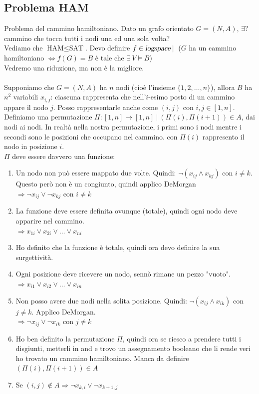 \documentclass[10pt]{book}
\begin{document}
\subsection{Problema HAM}
Problema del cammino hamiltoniano. Dato un grafo orientato $G = (N, A)$, $\exists?$ cammino che tocca tutti i nodi una ed una sola volta?\\
Vediamo che $\text{HAM} \leq \text{SAT}$. Devo definire $f \in \textsl{logspace}\:|\:$ ($G$ ha un cammino hamiltoniano $\Leftrightarrow f(G) = B$ è tale che $\exists\:V\vDash B$)\\
Vedremo una riduzione, ma non è la migliore.\\\\
Supponiamo che $G = (N, A)$ ha $n$ nodi (cioè l'insieme $\{1, 2, \ldots, n\}$), allora $B$ ha $n^2$ variabili $x_{i,j}$: ciascuna rappresenta che nell'$i$-esimo posto di un cammino appare il nodo $j$. Posso rappresentarle anche come $(i, j)$ con $i, j \in [1, n]$.\\
Definiamo una permutazione $\Pi : [1, n] \rightarrow [1, n]\:|\:\left(\Pi(i), \Pi(i+1)\right) \in A$, dai nodi ai nodi. In realtà nella nostra permutazione, i primi sono i nodi mentre i secondi sono le posizioni che occupano nel cammino. con $\Pi(i)$ rappresento il nodo in posizione $i$.\\
$\Pi$ deve essere davvero una funzione:
\begin{enumerate}
	\item Un nodo non può essere mappato due volte. Quindi: $\neg(x_{ij} \wedge x_{kj})$ con $i \neq k$. Questo però non è un congiunto, quindi applico DeMorgan\\
	$\Longrightarrow \neg x_{ij} \vee \neg x_{kj}$ con $i \neq k$
	\item La funzione deve essere definita ovunque (totale), quindi ogni nodo deve apparire nel cammino.\\
	$\Longrightarrow x_{1i} \vee x_{2i} \vee \ldots \vee x_{ni}$
	\item[] Ho definito che la funzione è totale, quindi ora devo definire la sua surgettività.
	\item Ogni posizione deve ricevere un nodo, sennò rimane un pezzo "vuoto".\\
	$\Longrightarrow x_{i1} \vee x_{i2} \vee \ldots \vee x_{in}$
	\item Non posso avere due nodi nella solita posizione. Quindi: $\neg(x_{ij} \wedge x_{ik})$ con $j \neq k$. Applico DeMorgan.\\
	$\Longrightarrow \neg x_{ij} \vee \neg x_{ik}$ con $j \neq k$
	\item[] Ho ben definito la permutazione $\Pi$, quindi ora se riesco a prendere tutti i disgiunti, metterli in and e trovo un assegnamento booleano che li rende veri ho trovato un cammino hamiltoniano. Manca da definire $\left(\Pi(i), \Pi(i+1)\right) \in A$
	\item Se $(i, j) \not\in A \Longrightarrow \neg x_{k,i} \vee \neg x_{k+1, j}$
\end{enumerate}
\end{document}
